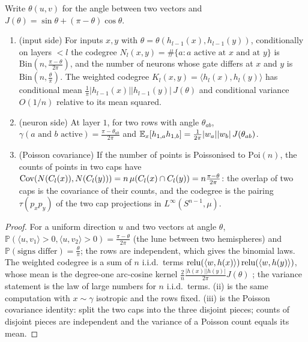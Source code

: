 \begin{lemma}\label{lem:duality}
Write $\theta(u,v)$ for the angle between two vectors and $J(\theta)=\sin\theta+(\pi-\theta)\cos\theta$.
\begin{enumerate}[label=(\roman*),nosep]
\item (input side) For inputs $x,y$ with $\theta=\theta(h_{l-1}(x),h_{l-1}(y))$, conditionally on layers $<l$ the
codegree $N_l(x,y)=\#\{a:\text{$a$ active at $x$ and at $y$}\}$ is $\mathrm{Bin}(n,\tfrac{\pi-\theta}{2\pi})$, and the
number of neurons whose gate differs at $x$ and $y$ is $\mathrm{Bin}(n,\tfrac\theta\pi)$. The weighted codegree
$K_l(x,y)=\langle h_l(x),h_l(y)\rangle$ has conditional mean $\tfrac1\pi|h_{l-1}(x)||h_{l-1}(y)|\,J(\theta)$ and
conditional variance $O(1/n)$ relative to its mean squared.
\item (neuron side) At layer $1$, for two rows with angle $\theta_{ab}$, $\gamma(\text{$a$ and $b$ active})=
\tfrac{\pi-\theta_{ab}}{2\pi}$ and $\mathbb E_x[h_{1,a}h_{1,b}]=\tfrac1{2\pi}|w_a||w_b|\,J(\theta_{ab})$.
\item (Poisson covariance) If the number of points is Poissonised to $\mathrm{Poi}(n)$, the counts of points in two
caps have $\operatorname{Cov}(N(C_l(x)),N(C_l(y)))=n\,\mu(C_l(x)\cap C_l(y))=n\tfrac{\pi-\theta}{2\pi}$: the overlap of two caps is the
covariance of their counts, and the codegree is the pairing $\tau(p_xp_y)$ of the two cap projections in
$L^\infty(S^{n-1},\mu)$.
\end{enumerate}
\end{lemma}
\begin{proof}
For a uniform direction $u$ and two vectors at angle $\theta$, $\mathbb P(\langle u,v_1\rangle>0,\langle u,v_2\rangle>0)
=\tfrac{\pi-\theta}{2\pi}$ (the lune between two hemispheres) and $\mathbb P(\text{signs differ})=\tfrac\theta\pi$; the
rows are independent, which gives the binomial laws. The weighted codegree is a sum of $n$ i.i.d.\ terms
$\operatorname{relu}(\langle w,h(x)\rangle)\operatorname{relu}(\langle w,h(y)\rangle)$, whose mean is the degree-one arc-cosine kernel
$\tfrac2n\tfrac{|h(x)||h(y)|}{2\pi}J(\theta)$ \cite{CS}; the variance statement is the law of large numbers for $n$
i.i.d.\ terms. (ii) is the same computation with $x\sim\gamma$ isotropic and the rows fixed. (iii) is the Poisson
covariance identity: split the two caps into the three disjoint pieces; counts of disjoint pieces are independent and
the variance of a Poisson count equals its mean.
\end{proof}

